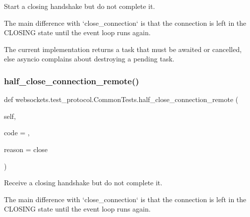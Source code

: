 \begin{DoxyVerb}Start a closing handshake but do not complete it.

The main difference with `close_connection` is that the connection is
left in the CLOSING state until the event loop runs again.

The current implementation returns a task that must be awaited or
cancelled, else asyncio complains about destroying a pending task.\end{DoxyVerb}
 \mbox{\label{classwebsockets_1_1test__protocol_1_1_common_tests_ac87a3d4ec375e6a1decc055686e62574}} 
\subsubsection{\texorpdfstring{half\+\_\+close\+\_\+connection\+\_\+remote()}{half\_close\_connection\_remote()}}
{\footnotesize\ttfamily def websockets.\+test\+\_\+protocol.\+Common\+Tests.\+half\+\_\+close\+\_\+connection\+\_\+remote (\begin{DoxyParamCaption}\item[{}]{self,  }\item[{}]{code = {},  }\item[{}]{reason = {\ttfamily \textquotesingle{}close\textquotesingle{}} }\end{DoxyParamCaption})}

\begin{DoxyVerb}Receive a closing handshake but do not complete it.

The main difference with `close_connection` is that the connection is
left in the CLOSING state until the event loop runs again.\end{DoxyVerb}
 \mbox{\label{classwebsockets_1_1test__protocol_1_1_common_tests_a06e19646b0fda6923ed411882d938e87}} 
